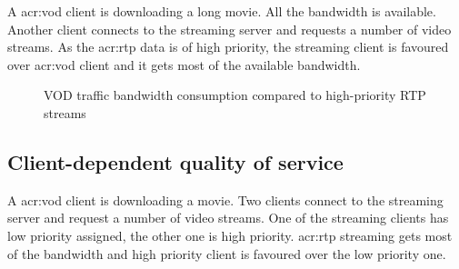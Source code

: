 \documentclass[11pt,openany]{book}
\begin{document}
        A \gls{acr:vod} client is downloading a long movie. All the bandwidth is available. Another client connects to the
        streaming server and requests a number of video streams. As the \gls{acr:rtp} data is of high priority, the streaming
        client is favoured over \gls{acr:vod} client and it gets most of the available bandwidth.

        \begin{figure}[H]
          \centering


          \caption{VOD traffic bandwidth consumption compared to high-priority RTP streams}
        \end{figure}


      \subsection{Client-dependent quality of service}
      \label{sub:uc:client}

        A \gls{acr:vod} client is downloading a movie. Two clients connect to the streaming server and request a number
        of video streams. One of the streaming clients has low priority assigned, the other one is high priority.
        \gls{acr:rtp} streaming gets most of the bandwidth and high priority client is favoured over the low priority
        one.
\end{document}
